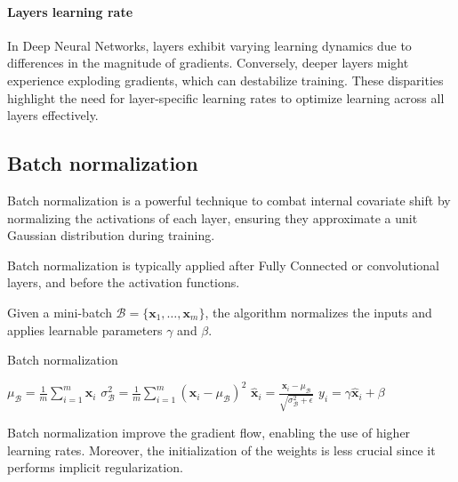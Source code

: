 \paragraph*{Layers learning rate}
In Deep Neural Networks, layers exhibit varying learning dynamics due to differences in the magnitude of gradients. 
Conversely, deeper layers might experience exploding gradients, which can destabilize training. 
These disparities highlight the need for layer-specific learning rates to optimize learning across all layers effectively.

\subsection{Batch normalization}
Batch normalization is a powerful technique to combat internal covariate shift by normalizing the activations of each layer, ensuring they approximate a unit Gaussian distribution during training.

\noindent Batch normalization is typically applied after Fully Connected or convolutional layers, and before the activation functions.

Given a mini-batch $\mathcal{B} = \{ \mathbf{x}_1, \dots, \mathbf{x}_m \}$, the algorithm normalizes the inputs and applies learnable parameters $\gamma$ and $\beta$. 
\begin{algorithm}
    \caption{Batch normalization}
    \begin{algorithmic}[1]
        \State $\mu_{\mathcal{B}} = \frac{1}{m} \sum_{i=1}^m \mathbf{x}_i$ 
        \State $\sigma_{\mathcal{B}}^2 = \frac{1}{m} \sum_{i=1}^m (\mathbf{x}_i - \mu_{\mathcal{B}})^2$ 
        \State $\hat{\mathbf{x}}_i = \frac{\mathbf{x}_i - \mu_{\mathcal{B}}}{\sqrt{\sigma_{\mathcal{B}}^2 + \epsilon}}$ 
        \State $y_i = \gamma \hat{\mathbf{x}}_i + \beta$ 
    \end{algorithmic}
\end{algorithm}

\noindent Batch normalization improve the gradient flow, enabling the use of higher learning rates. 
Moreover, the initialization of the weights is less crucial since it performs implicit regularization. 

